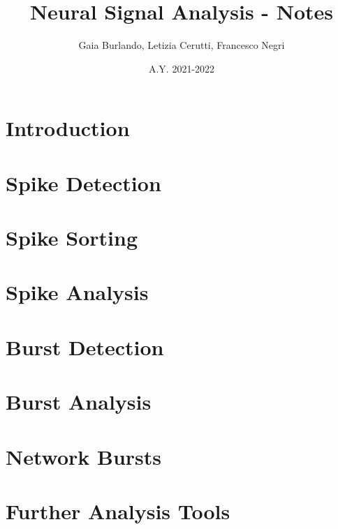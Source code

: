 \documentclass[12pt]{article}
\title{Neural Signal Analysis - Notes}
\author{Gaia Burlando, Letizia Cerutti, Francesco Negri}
\date{A.Y. 2021-2022}
\begin{document}
\maketitle

\tableofcontents
\newpage

\section{Introduction}
\graphicspath{ {./images/1/} }

\newpage

\section{Spike Detection}
\graphicspath{ {./images/2/} }

\newpage

\section{Spike Sorting}
\graphicspath{ {./images/3/} }

\newpage

\section{Spike Analysis}
\graphicspath{ {./images/4/} }

\newpage

\section{Burst Detection}
\graphicspath{ {./images/5/} }

\newpage

\section{Burst Analysis}
\graphicspath{ {./images/6/} }

\newpage

\section{Network Bursts}
\graphicspath{ {./images/7/} }

\newpage

\section{Further Analysis Tools}
\graphicspath{ {./images/8/} }

\newpage
\end{document}
